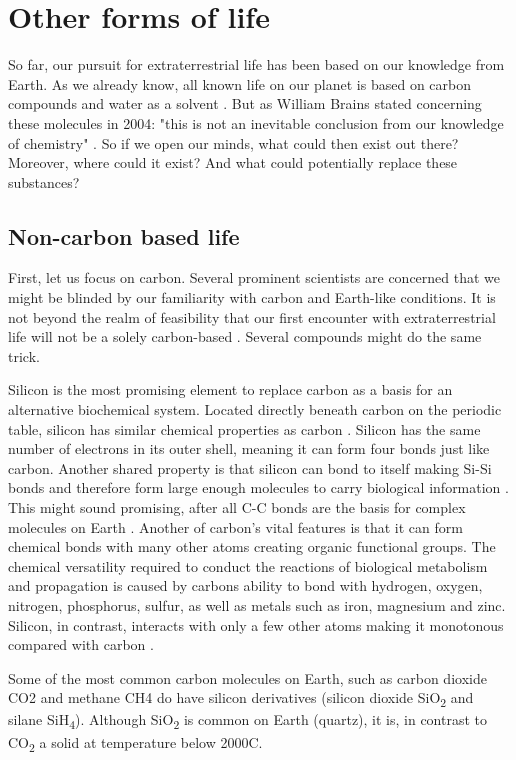 \section*{Other forms of life}

So far, our pursuit for extraterrestrial life has been based on our knowledge from Earth.
As we already know, all known life on our planet is based on carbon compounds and water as a solvent \cite{OForm2}.
But as William Brains stated concerning these molecules in 2004: "this is not an inevitable conclusion from our knowledge of chemistry" \cite{OForm1}.
So if we open our minds, what could then exist out there?
Moreover, where could it exist?
And what could potentially replace these substances?

\subsection*{Non-carbon based life}

First, let us focus on carbon. Several prominent scientists are concerned that we might be blinded by our familiarity with carbon and Earth-like conditions.
It is not beyond the realm of feasibility that our first encounter with extraterrestrial life will not be a solely carbon-based \cite{OForm3}.
Several compounds might do the same trick.

Silicon is the most promising element to replace carbon as a basis for an alternative biochemical system. 
Located directly beneath carbon on the periodic table, silicon has similar chemical properties as carbon \cite{OForm4}.
Silicon has the same number of electrons in its outer shell, meaning it can form four bonds just like carbon.
Another shared property is that silicon can bond to itself making Si-Si bonds and therefore form large enough molecules to carry biological information \cite{OForm5}.
This might sound promising, after all C-C bonds are the basis for complex molecules on Earth \cite{OForm4}.
Another of carbon's vital features is that it can form chemical bonds with many other atoms creating organic functional groups.
The chemical versatility required to conduct the reactions of biological metabolism and propagation is caused by carbons ability to bond with hydrogen, oxygen, nitrogen, phosphorus, sulfur, as well as metals such as iron, magnesium and zinc.
Silicon, in contrast, interacts with only a few other atoms making it monotonous compared with carbon \cite{OForm5}.

Some of the most common carbon molecules on Earth, such as carbon dioxide CO2 and methane CH4 do have silicon derivatives (silicon dioxide SiO\textsubscript{2} and silane SiH\textsubscript{4}).
Although SiO\textsubscript{2} is common on Earth (quartz), it is, in contrast to CO\textsubscript{2} a solid at temperature below 2000\degree C.

